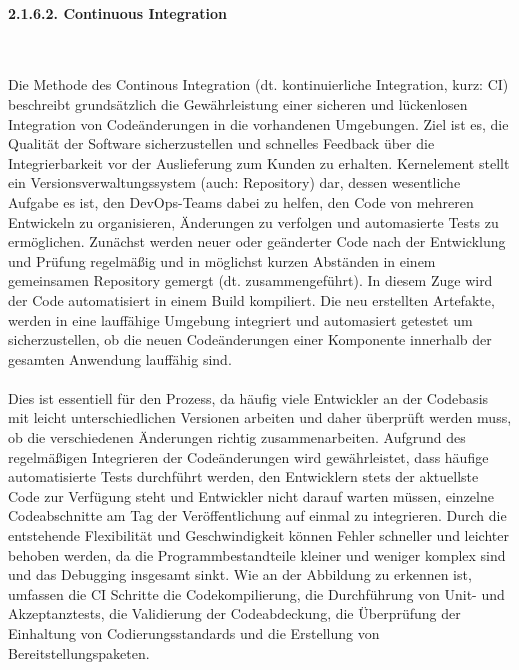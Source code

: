 \paragraph{2.1.6.2. Continuous Integration} $~$

Die Methode des Continous Integration (dt. kontinuierliche Integration, kurz: CI) beschreibt grundsätzlich die Gewährleistung einer sicheren und lückenlosen Integration von Codeänderungen in die vorhandenen Umgebungen. \cite[S. 266]{tokarski_strategische_2018} Ziel ist es, die Qualität der Software sicherzustellen und schnelles Feedback über die Integrierbarkeit vor der Auslieferung zum Kunden zu erhalten. \cite[S. 266]{tokarski_strategische_2018} Kernelement stellt ein Versionsverwaltungssystem (auch: Repository) dar, dessen wesentliche Aufgabe es ist, den DevOps-Teams dabei zu helfen, den Code von mehreren Entwickeln zu organisieren, Änderungen zu verfolgen und automasierte Tests zu ermöglichen. Zunächst werden neuer oder geänderter Code nach der Entwicklung und Prüfung regelmäßig und in möglichst kurzen Abständen in einem gemeinsamen Repository gemergt (dt. zusammengeführt). \cite[S. 13-16]{sharma_devops_2017} In diesem Zuge wird der Code automatisiert in einem Build kompiliert. Die neu erstellten Artefakte, werden in eine lauffähige Umgebung integriert und automasiert getestet um sicherzustellen, ob die neuen Codeänderungen einer Komponente innerhalb der gesamten Anwendung lauffähig sind.\\\\ Dies ist essentiell für den Prozess, da häufig viele Entwickler an der Codebasis mit leicht unterschiedlichen Versionen arbeiten und daher überprüft werden muss, ob die verschiedenen Änderungen richtig zusammenarbeiten. \cite[S. 69]{verona_practical_2016} Aufgrund des regelmäßigen Integrieren der Codeänderungen wird gewährleistet, dass häufige automatisierte Tests durchführt werden, den Entwicklern stets der aktuellste Code zur Verfügung steht und Entwickler nicht darauf warten müssen, einzelne Codeabschnitte am Tag der Veröffentlichung auf einmal zu integrieren. \cite{thedev_eight_2019} Durch die entstehende Flexibilität und Geschwindigkeit können Fehler schneller und leichter behoben werden, da die Programmbestandteile kleiner und weniger komplex sind und das Debugging insgesamt sinkt. \cite{thedev_eight_2019} Wie an der Abbildung zu erkennen ist, umfassen die CI Schritte die Codekompilierung, die Durchführung von Unit- und Akzeptanztests, die Validierung der Codeabdeckung, die Überprüfung der Einhaltung von Codierungsstandards und die Erstellung von Bereitstellungspaketen. \cite{fitzgerald_continuous_2014} 

